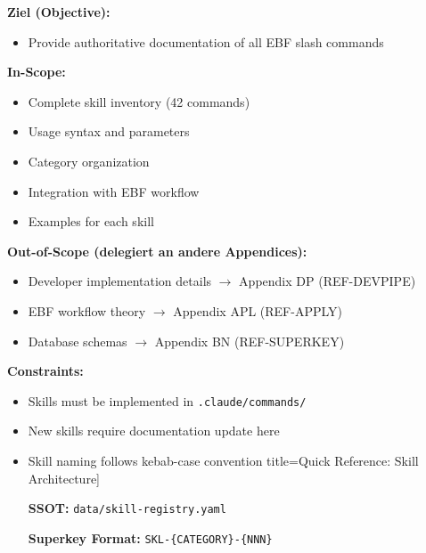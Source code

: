 
\begin{tcolorbox}[
    colback=orange!5!white,
    colframe=orange!75!black,
    title={\textbf{Appendix Scope: Ziel / In-Scope / Out-of-Scope / Constraints}},
    fonttitle=\bfseries
]

\textbf{Ziel (Objective):}
\begin{itemize}[nosep]
    \item Provide authoritative documentation of all EBF slash commands
\end{itemize}

\textbf{In-Scope:}
\begin{itemize}[nosep]
    \item Complete skill inventory (42 commands)
    \item Usage syntax and parameters
    \item Category organization
    \item Integration with EBF workflow
    \item Examples for each skill
\end{itemize}

\textbf{Out-of-Scope (delegiert an andere Appendices):}
\begin{itemize}[nosep]
    \item Developer implementation details $\rightarrow$ Appendix DP (REF-DEVPIPE)
    \item EBF workflow theory $\rightarrow$ Appendix APL (REF-APPLY)
    \item Database schemas $\rightarrow$ Appendix BN (REF-SUPERKEY)
\end{itemize}

\textbf{Constraints:}
\begin{itemize}[nosep]
    \item Skills must be implemented in \texttt{.claude/commands/}
    \item New skills require documentation update here
    \item Skill naming follows kebab-case convention
    title=Quick Reference: Skill Architecture]

\textbf{SSOT:} \texttt{data/skill-registry.yaml}

\textbf{Superkey Format:} \texttt{SKL-\{CATEGORY\}-\{NNN\}}


\end{itemize}
\end{tcolorbox}

